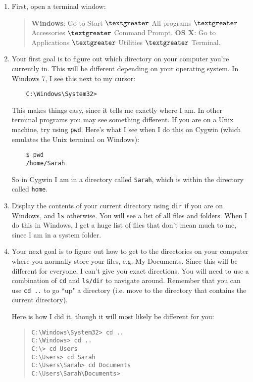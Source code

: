 \documentclass[english,12pt]{article}
\begin{document}
\begin{enumerate}
\item First, open a terminal window:

\begin{quote}
\textbf{Windows}: Go to Start $\textgreater$ All programs $\textgreater$ Accessories $\textgreater$ Command Prompt. 
\textbf{OS X}: Go to Applications $\textgreater$ Utilities $\textgreater$ Terminal. 
\end{quote}


\item Your first goal is to figure out which directory on your computer you're currently in. This will be different depending on your operating system. In Windows 7, I see this next to my cursor:
\begin{verbatim}
    C:\Windows\System32>
\end{verbatim}

This makes things easy, since it tells me exactly where I am. In other terminal programs you may see something different. If you are on a Unix machine, try using \texttt{pwd}. Here's what I see when I do this on Cygwin (which emulates the Unix terminal on Windows):
\begin{verbatim}
    $ pwd
    /home/Sarah
\end{verbatim}

So in Cygwin I am in a directory called \texttt{Sarah}, which is within the directory called \texttt{home}.

\item Display the contents of your current directory using \texttt{dir} if you are on Windows, and \texttt{ls} otherwise. You will see a list of all files and folders. When I do this in Windows, I get a huge list of files that don't mean much to me, since I am in a system folder. 

\item Your next goal is to figure out how to get to the directories on your computer where you normally store your files, e.g. My Documents. Since this will be different for everyone, I can't give you exact directions. You will need to use a combination of \texttt{cd} and \texttt{ls/dir} to navigate around. Remember that you can use \texttt{cd ..} to go ``up" a directory (i.e. move to the directory that contains the current directory).

Here is how I did it, though it will most likely be different for you:
\begin{quote}
\begin{verbatim}
C:\Windows\System32> cd ..
C:\Windows> cd ..
C:\> cd Users
C:\Users> cd Sarah
C:\Users\Sarah> cd Documents
C:\Users\Sarah\Documents>
\end{verbatim}
\end{quote}


\end{enumerate}
\end{document}
